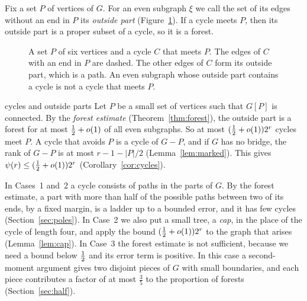 Fix a set $P$ of vertices of $G$. For an even subgraph $\xi$ we call the set of its edges without
an end in $P$ its \emph{outside part} (Figure~\ref{fig:outside}). If a cycle meets $P$, then its
outside part is a proper subset of a cycle, so it is a forest.

\begin{figure}[ht]
\centering
{}
\caption{A set $P$ of six vertices and a cycle $C$ that meets $P$. The edges of $C$ with an end
in $P$ are dashed. The other edges of $C$ form its outside part, which is a path. An even
subgraph whose outside part contains a cycle is not a cycle that meets $P$.}
\label{fig:outside}
\end{figure}

\begin{idea}{cycles and outside parts}
Let $P$ be a small set of vertices such that $G[P]$ is connected. By the \emph{forest estimate}
(Theorem~\ref{thm:forest}), the outside part is a forest for at most $\tfrac12+o(1)$ of all even
subgraphs. So at most $(\tfrac12+o(1))2^{r}$ cycles meet $P$. A cycle that avoids $P$ is a cycle of
$G-P$, and if $G$ has no bridge, the rank of $G-P$ is at most $r-1-|P|/2$
(Lemma~\ref{lem:marked}). This gives $\psi(r)\le(\tfrac12+o(1))2^{r}$ (Corollary~\ref{cor:cycles}).
\end{idea}

In Cases~1 and~2 a cycle consists of paths in the parts of $G$. By the forest estimate,
a part with more than half of the possible paths between two of its ends, by a fixed margin, is a
ladder up to a bounded error, and it has few cycles (Section~\ref{sec:poles}). In Case~2 we
also put a small tree, a \emph{cap}, in the place of the cycle of length four, and apply the
bound $(\tfrac12+o(1))2^{r}$ to the graph that arises (Lemma~\ref{lem:cap}). In Case~3 the
forest estimate is not sufficient, because we need a bound below $\tfrac12$ and its error term is
positive. In this case a second-moment argument gives two disjoint pieces of $G$ with small
boundaries, and each piece contributes a factor of at most $\frac35$ to the proportion of
forests (Section~\ref{sec:half}).

